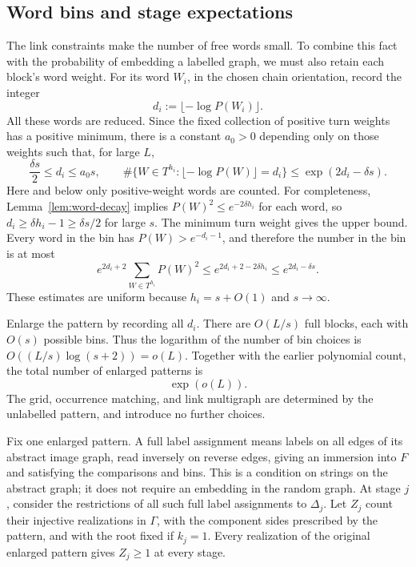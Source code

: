 \subsection{Word bins and stage expectations}

The link constraints make the number of free words small.  To combine
this fact with the probability of embedding a labelled graph, we must
also retain each block's word weight.  For its word $W_i$, in the chosen
chain orientation, record the integer
\[
 d_i:=\lfloor-\log P(W_i)\rfloor.
\]
All these words are reduced.  Since the fixed collection of positive
turn weights has a positive minimum, there is a constant $a_0>0$
depending only on those weights such that, for large $L$,
\begin{equation}\label{eq:word-bin-bounds}
 \frac{\delta s}{2}\leq d_i\leq a_0s,
 \qquad
 \#\{W\in T^{h_i}:\lfloor-\log P(W)\rfloor=d_i\}
 \leq\exp(2d_i-\delta s).
\end{equation}
Here and below only positive-weight words are counted.  For completeness,
Lemma~\ref{lem:word-decay} implies
$P(W)^2\leq e^{-2\delta h_i}$ for each word, so
$d_i\geq\delta h_i-1\geq\delta s/2$ for large $s$.
The minimum turn weight gives the upper bound.  Every word in the bin
has $P(W)>e^{-d_i-1}$, and therefore the number in the bin is at most
\[
 e^{2d_i+2}\sum_{W\in T^{h_i}}P(W)^2
 \leq e^{2d_i+2-2\delta h_i}
 \leq e^{2d_i-\delta s}.
\]
These estimates are uniform because $h_i=s+O(1)$ and $s\to\infty$.

Enlarge the pattern by recording all $d_i$.  There are $O(L/s)$ full
blocks, each with $O(s)$ possible bins.  Thus the logarithm of the
number of bin choices is
$O((L/s)\log(s+2))=o(L)$.  Together with the earlier polynomial count,
the total number of enlarged patterns is
\begin{equation}\label{eq:pattern-entropy}
 \exp(o(L)).
\end{equation}
The grid, occurrence matching, and link multigraph are determined
by the unlabelled pattern, and introduce no further choices.

Fix one enlarged pattern.  A full label assignment means labels on
all edges of its abstract image graph, read inversely on reverse
edges, giving an immersion into $F$ and satisfying the comparisons
and bins.  This is a condition on strings on the abstract graph; it
does not require an embedding in the random graph.  At stage $j$,
consider the restrictions of all such full label assignments to
$\Delta_j$.  Let $Z_j$ count their injective realizations in $\Gamma$,
with the component sides prescribed by the pattern, and with the
root fixed if $k_j=1$.  Every realization of the original enlarged
pattern gives $Z_j\geq1$ at every stage.

